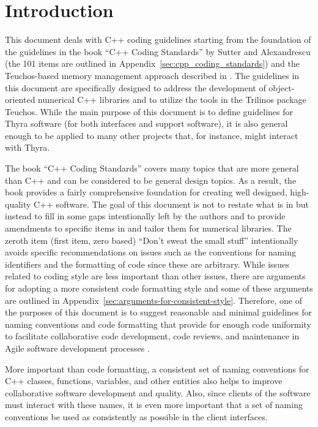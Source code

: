 %
\section{Introduction}
%

This document deals with C++ coding guidelines starting from the
foundation of the guidelines in the book ``C++ Coding Standards'' by
Sutter and Alexandrescu {}\cite{C++CodingStandards05} (the 101 items
are outlined in Appendix~\ref{sec:cpp_coding_standards}) and the
Teuchos-based memory management approach described in
{}\cite{TeuchosMemoryManagementGuide}.  The guidelines in this
document are specifically designed to address the development of
object-oriented numerical C++ libraries and to utilize the tools in
the Trilinos package Teuchos.  While the main purpose of this document
is to define guidelines for Thyra software (for both interfaces and
support software), it is also general enough to be applied to many
other projects that, for instance, might interact with Thyra.

The book ``C++ Coding Standards'' {}\cite{C++CodingStandards05} covers
many topics that are more general than C++ and can be considered to be
general design topics.  As a result, the book
{}\cite{C++CodingStandards05} provides a fairly comprehensive
foundation for creating well designed, high-quality C++ software.  The
goal of this document is not to restate what is in
{}\cite{C++CodingStandards05} but instead to fill in some gaps
intentionally left by the authors and to provide amendments to
specific items in {}\cite{C++CodingStandards05} and tailor them for
numerical libraries.  The zeroth item (first item, zero based) ``Don't
sweat the small stuff'' intentionally avoids specific recommendations
on issues such as the conventions for naming identifiers and the
formatting of code since these are arbitrary.  While issues related to
coding style are less important than other issues, there are arguments
for adopting a more consistent code formatting style and some of these
arguments are outlined in
Appendix~\ref{sec:arguments-for-consistent-style}.  Therefore, one of
the purposes of this document is to suggest reasonable and minimal
guidelines for naming conventions and code formatting that provide for
enough code uniformity to facilitate collaborative code development,
code reviews, and maintenance in Agile software development processes
{}\cite{ExtremeProgrammingExplained2nd04}.

More important than code formatting, a consistent set of naming conventions
for C++ classes, functions, variables, and other entities also helps to
improve collaborative software development and quality.  Also, since clients
of the software must interact with these names, it is even more important that
a set of naming conventions be used as consistently as possible in the client
interfaces.

